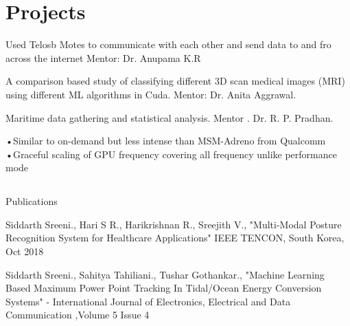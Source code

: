 \documentclass[]{deedy-resume-openfont}
\begin{document}
\begin{minipage}[t]{0.66\textwidth}

\section{Projects}

Used Telosb Motes to communicate with each other and send data to and fro across the internet
Mentor: Dr. Anupama K.R
\sectionsep

A comparison based study of classifying different 3D scan medical images (MRI) using different ML algorithms in Cuda.
Mentor: Dr. Anita Aggrawal.
\sectionsep

Maritime data gathering and statistical analysis.
Mentor . Dr. R. P. Pradhan.
\sectionsep

•Similar to on-demand but less intense than MSM-Adreno from Qualcomm 
•Graceful scaling of GPU frequency covering all frequency unlike performance mode 
\sectionsep
\end{minipage} 
\subsection{}{Publications} 
\begin{tightemize} \item Siddarth Sreeni., Hari S R., Harikrishnan R., Sreejith V., "Multi-Modal Posture Recognition System for Healthcare Applications" IEEE TENCON, South Korea, Oct 2018\\
\item Siddarth Sreeni., Sahitya Tahiliani., Tushar Gothankar., "Machine Learning Based Maximum Power Point Tracking In Tidal/Ocean Energy Conversion Systems" - International Journal  of Electronics, Electrical and Data Communication ,Volume 5 Issue 4
\end{tightemize}
\end{document}

